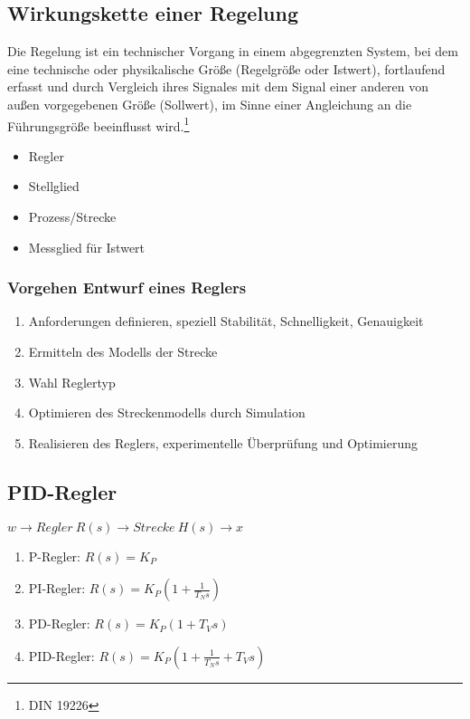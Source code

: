 \subsection{Wirkungskette einer Regelung}
Die Regelung ist ein technischer Vorgang in einem abgegrenzten System, bei dem eine technische oder physikalische Größe (Regelgröße oder Istwert), fortlaufend erfasst und durch Vergleich ihres Signales mit dem Signal einer anderen von außen vorgegebenen Größe (Sollwert), im Sinne einer Angleichung an die Führungsgröße beeinflusst wird.\footnote{DIN 19226}

\begin{itemize}
	\item Regler
	\item Stellglied
	\item Prozess/Strecke
	\item Messglied für Istwert
\end{itemize}

\subsubsection{Vorgehen Entwurf eines Reglers}
\begin{enumerate}
	\item Anforderungen definieren, speziell Stabilität, Schnelligkeit, Genauigkeit
	\item Ermitteln des Modells der Strecke
	\item Wahl Reglertyp
	\item Optimieren des Streckenmodells durch Simulation
	\item Realisieren des Reglers, experimentelle Überprüfung und Optimierung
\end{enumerate}


\subsection{PID-Regler}
\(w \rightarrow Regler~R(s) \rightarrow Strecke~H(s) \rightarrow x\)

\begin{enumerate}
	\item P-Regler: \(R(s) = K_P\)
	\item PI-Regler: \(R(s) = K_P(1+\frac{1}{T_Ns})\)
	\item PD-Regler: \(R(s) = K_P(1+T_Vs)\)
	\item PID-Regler: \(R(s) = K_P(1+\frac{1}{T_Ns}+T_Vs)\)
\end{enumerate}


